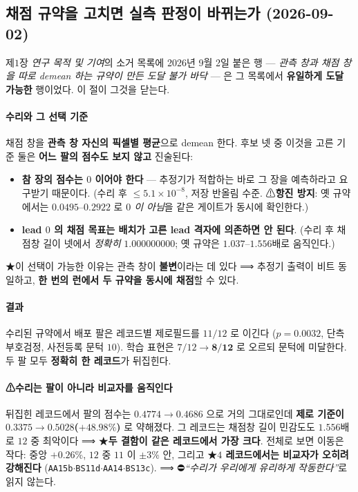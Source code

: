 \documentclass[11pt]{report}
\numberwithin{equation}{chapter}
\numberwithin{figure}{chapter}
\numberwithin{table}{chapter}
\begin{document}
\subsection{채점 규약을 고치면 실측 판정이 바뀌는가 (2026-09-02)}
\label{sec:results_r1b}

제$1$장 \emph{연구 목적 및 기여}의 소거 목록에 2026년 9월 2일 붙은 행 --- \emph{관측
창과 채점 창을 따로 demean 하는 규약이 만든 도달 불가 바닥} --- 은 그 목록에서
\textbf{유일하게 도달 가능한} 행이었다. 이 절이 그것을 닫는다.

\paragraph{수리와 그 선택 기준}
채점 창을 \textbf{관측 창 자신의 픽셀별 평균}으로 demean 한다. 후보 넷 중 이것을 고른
기준 둘은 \textbf{어느 팔의 점수도 보지 않고} 진술된다:
\begin{itemize}
  \item \textbf{참 장의 점수는 $0$ 이어야 한다} --- 추정기가 적합하는 바로 그 장을
        예측하라고 요구받기 때문이다. (수리 후 $\le 5.1\times10^{-8}$, 저장 반올림 수준.
        ⚠\textbf{항진 방지}: 옛 규약에서는 $0.0495$--$0.2922$ 로 \emph{$0$ 이 아님}을
        같은 게이트가 동시에 확인한다.)
  \item \textbf{lead $0$ 의 채점 목표는 배치가 고른 lead 격자에 의존하면 안 된다}.
        (수리 후 채점창 길이 넷에서 \emph{정확히} $1.000000000$; 옛 규약은
        $1.037$--$1.556$배로 움직인다.)
\end{itemize}
★이 선택이 가능한 이유는 관측 창이 \textbf{불변}이라는 데 있다 ⟹ 추정기 출력이 비트
동일하고, \textbf{한 번의 런에서 두 규약을 동시에 채점}할 수 있다.

\paragraph{결과}
수리된 규약에서 배포 팔은 레코드별 제로필드를 \textbf{$11/12$} 로 이긴다
($p = 0.0032$, 단측 부호검정, 사전등록 문턱 $10$). 학습 표현은 $7/12 \to \textbf{8/12}$
로 오르되 문턱에 미달한다. 두 팔 모두 \textbf{정확히 한 레코드}가 뒤집힌다.

\paragraph{⚠수리는 팔이 아니라 비교자를 움직인다}
뒤집힌 레코드에서 팔의 점수는 $0.4774 \to 0.4686$ 으로 거의 그대로인데
\textbf{제로 기준이 $0.3375 \to 0.5028$($+48.98\%$)} 로 약해졌다. 그 레코드는
채점창 길이 민감도도 $1.556$배로 $12$ 중 최악이다 ⟹ ★\textbf{두 결함이 같은 레코드에서
가장 크다}. 전체로 보면 이동은 작다: 중앙 $+0.26\%$, $12$ 중 $11$ 이 $\pm3\%$ 안,
그리고 ★\textbf{$4$ 레코드에서는 비교자가 오히려 강해진다}
(\texttt{AA15b}$\cdot$\texttt{BS11d}$\cdot$\texttt{AA14}$\cdot$\texttt{BS13c}).
⟹ ⛔\emph{``수리가 우리에게 유리하게 작동한다''}로 읽지 않는다.
\end{document}
